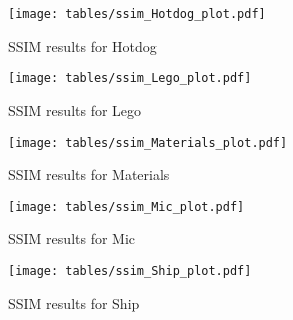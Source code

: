 \begin{figure}[h!]
\centering
\texttt{[image: tables/ssim\_Hotdog\_plot.pdf]}
\caption{SSIM results for Hotdog}
\label{fig:ap_ssim_Hotdog_plot}
\end{figure}

\begin{figure}[h!]
\centering
\texttt{[image: tables/ssim\_Lego\_plot.pdf]}
\caption{SSIM results for Lego}
\label{fig:ap_ssim_Lego_plot}
\end{figure}

\begin{figure}[h!]
\centering
\texttt{[image: tables/ssim\_Materials\_plot.pdf]}
\caption{SSIM results for Materials}
\label{fig:ap_ssim_Materials_plot}
\end{figure}

\begin{figure}[h!]
\centering
\texttt{[image: tables/ssim\_Mic\_plot.pdf]}
\caption{SSIM results for Mic}
\label{fig:ap_ssim_Mic_plot}
\end{figure}

\begin{figure}[h!]
\centering
\texttt{[image: tables/ssim\_Ship\_plot.pdf]}
\caption{SSIM results for Ship}
\label{fig:ap_ssim_Ship_plot}
\end{figure}
